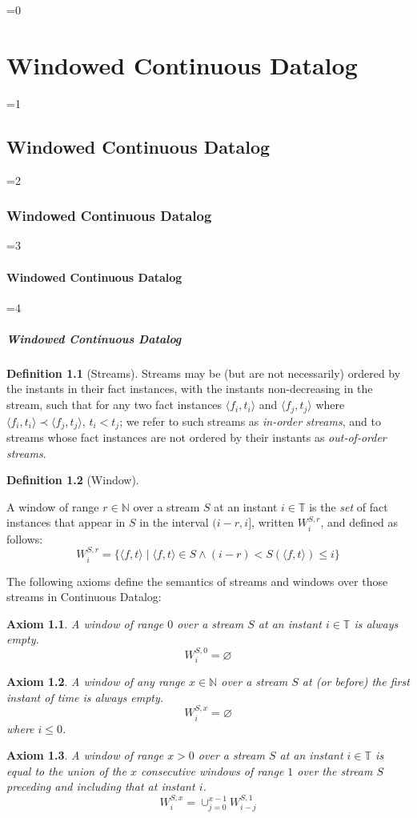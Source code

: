 \documentclass[twocolumn,preprint,3p,number]{elsarticle}
\theoremstyle{plain}
\newtheorem{axiom}{Axiom}
\theoremstyle{definition}
\newtheorem{definition}{Definition}
\newcounter{nestingdepth}
\newenvironment{nestedsection}[2]{
  \ifnum\value{nestingdepth}=0
    \chapter{#1}
  \else
    \ifnum\value{nestingdepth}=1
      \section{#1}
    \else
      \ifnum\value{nestingdepth}=2
        \subsection{#1}
      \else
        \ifnum\value{nestingdepth}=3
          \subsubsection{#1}
        \else
          \ifnum\value{nestingdepth}=4
            \paragraph{#1}
          \else
            \PackageError{nestedsections}{Maximum nesting level exceeded!}{uh oh!}
          \fi
        \fi
      \fi
    \fi
  \fi
  \addtocounter{nestingdepth}{1}
  \label{sec:#2}
}{\addtocounter{nestingdepth}{-1}}
\def\labeldef#1{\label{def:#1}}
\begin{document}
\begin{nestedsection}{Windowed Continuous Datalog}{semantics}
\begin{definition}[Streams]
Streams may be (but are not necessarily) ordered by the instants in
their fact instances, with the instants non-decreasing in the stream,
such that for any two fact instances $\langle f_i, t_i \rangle$ and
$\langle f_j, t_j\rangle$ where $\langle f_i, t_i \rangle \prec
\langle f_j, t_j \rangle$, $t_i < t_j$; we refer to such
streams as {\em in-order streams}, and to streams whose fact instances
are not ordered by their instants as {\em out-of-order streams}.
\end{definition}

\begin{definition}[Window]
\labeldef{continuous datalog: window}

A window of range ${r \in \mathbb{N}}$ over a stream $S$ at an instant
${i \in \mathbb{T}}$ is the \emph{set} of fact instances that appear in
$S$ in the interval ${(i-r,i]}$, written ${W^{S,r}_{i}}$, and defined as follows:
\[
W^{S,r}_i = \{ \langle f, t \rangle \mid \langle f, t \rangle \in S \land (i - r) < S(\langle f, t\rangle) \leqslant i \}
\]  
\end{definition}

The following axioms define the semantics of streams and windows over
those streams in Continuous Datalog:

{\nobreak\begin{axiom}\label{axiom:continuous datalog: window range leq 0}
A window of range $0$ over a stream $S$ at an instant 
${i \in \mathbb{T}}$ is always empty.
\begin{equation*}
W^{S,0}_{i} = \varnothing
\end{equation*}
\end{axiom}}

{\nobreak\begin{axiom}\label{axiom:continuous datalog: window start leq 0}
A window of any range $x \in \mathbb{N}$ over a stream $S$ at (or before)
the first instant of time is always empty.
\begin{equation*}
W^{S,x}_{i} = \varnothing
\end{equation*}
where $i \leqslant 0$.
\end{axiom}}

{\nobreak\begin{axiom}\label{axiom:continuous datalog: window composition}
A window of range ${x > 0}$ over a stream $S$ at an instant 
${i \in \mathbb{T}}$ is equal to the union of the $x$ consecutive
windows of range $1$ over the stream $S$ preceding and including that at
instant $i$.
\begin{equation*}
W^{S,x}_{i} = \mathop{\cup}_{j=0}^{x-1} W^{S,1}_{i-j}
\end{equation*}
\end{axiom}}


\end{nestedsection}
\end{document}
